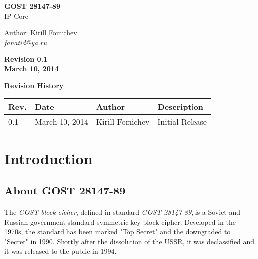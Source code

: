 \documentclass[a4paper,12pt]{article}
\newcommand{\currentRevision}{0.1}
\newcommand{\releaseDate}{March 10, 2014}
\begin{document}
\begin{titlepage}
\begin{flushright}

\vspace*{4cm}
\Huge
\textbf{GOST 28147-89}\\IP Core

\vspace{4cm}
\large
Author: Kirill Fomichev\\
\textsl{fanatid@ya.ru}

\vspace{4cm}
\textbf{Revision \currentRevision\\\releaseDate}

\end{flushright}
\end{titlepage}


\begin{flushright}
\Large
\textbf{Revision History}
\normalsize
\end{flushright}

\begin{flushleft}
{\renewcommand{\arraystretch}{1.5}
\begin{tabularx}{\textwidth}{|l|l|l|X|}
\hline
\textbf{Rev.} & \textbf{Date} & \textbf{Author} & \textbf{Description}\\
\hline
0.1 & March 10, 2014 & Kirill Fomichev & Initial Release\\
\hline
\end{tabularx}}
\end{flushleft}

\newpage
\tableofcontents

\newpage
\section{Introduction}

\subsection{About GOST 28147-89}
\paragraph{}
The \textsl{GOST block cipher}, defined in standard \textsl{GOST 28147-89},
is a Soviet and Russian government standard symmetric key block cipher.
Developed in the 1970s, the standard has been marked "Top Secret" and
the downgraded to "Secret" in 1990. Shortly after the dissolution of the USSR,
it was declassified and it was released to the public in 1994.
\end{document}
